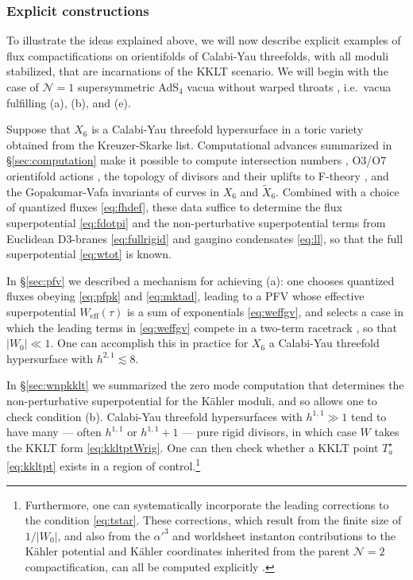 \documentclass[12pt,a4wide]{article}
\begin{document}
\subsubsection{Explicit constructions}\label{sec:explicitkklt}

To illustrate
the ideas explained above,
we will now describe
explicit examples of flux compactifications on orientifolds of Calabi-Yau threefolds, with all moduli stabilized, that 
are incarnations of the KKLT scenario.  We will begin with the case of 
$\mathcal{N}=1$ supersymmetric AdS$_4$ vacua  
without warped throats \cite{Demirtas:2021nlu}, i.e.~vacua fulfilling (a), (b), and (e).

Suppose that $X_6$ is a Calabi-Yau threefold hypersurface in a toric variety obtained from the Kreuzer-Skarke list.  
Computational advances summarized in \S\ref{sec:computation} make it possible to compute intersection numbers \cite{Demirtas:2022hqf}, O3/O7 orientifold actions \cite{Moritz:2023jdb}, the topology of divisors and their uplifts to F-theory \cite{Kim:2021lwo,Jefferson:2022ssj}, and the Gopakumar-Vafa invariants of curves \cite{Demirtas:2023als} in $X_6$ and $\widetilde{X}_6$.  Combined with a choice of quantized fluxes \eqref{eq:fhdef}, these data suffice to determine the flux superpotential \eqref{eq:fdotpi} and the non-perturbative superpotential terms  from Euclidean D3-branes \eqref{eq:fullrigid} and gaugino condensates \eqref{eq:ll}, so that the full superpotential \eqref{eq:wtot} is known.

In \S\ref{sec:pfv} we described a mechanism for achieving (a): one chooses quantized
fluxes obeying \eqref{eq:pfpk} and \eqref{eq:mktad}, leading to a PFV whose effective superpotential $W_{\text{eff}}(\tau)$ is a sum of exponentials \eqref{eq:weffgv},
and selects a case in which the leading terms in \eqref{eq:weffgv} compete in a two-term racetrack \cite{Demirtas:2019sip}, so that $|W_0| \ll 1$.
One can accomplish this in practice for $X_6$  a Calabi-Yau threefold hypersurface with $h^{2,1} \lesssim 8$.

In \S\ref{sec:wnpkklt} we summarized the zero mode computation that determines the non-perturbative superpotential for the K\"ahler moduli, and so allows one to check condition (b).  Calabi-Yau threefold hypersurfaces with $h^{1,1} \gg 1$ tend to have many --- often $h^{1,1}$ or $h^{1,1}+1$ --- pure rigid divisors, in which case $W$ takes the KKLT form \eqref{eq:kkltptWrig}.
One can then check whether a KKLT point $T_a^{\star}$ \eqref{eq:kkltpt} exists in a region of control.\footnote{Furthermore, one can systematically incorporate the leading corrections to the condition \eqref{eq:tstar}. These corrections, which result from the finite size of $1/|W_0|$, and also from the $\alpha'^3$ and worldsheet instanton contributions to the K\"ahler potential and K\"ahler coordinates inherited from the parent $\mathcal{N}=2$ compactification, can all be computed explicitly \cite{Demirtas:2021nlu}.}
\end{document}
